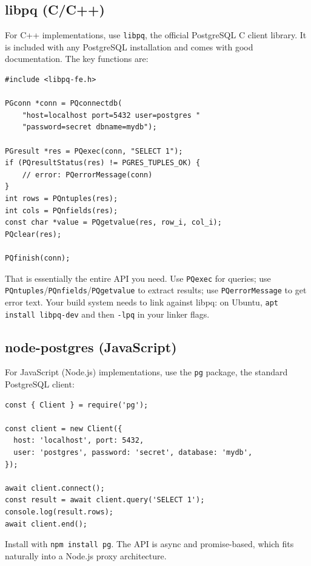 \documentclass[11pt,a4paper]{article}
\begin{document}
\subsection{libpq (C/C++)}
For C++ implementations, use \texttt{libpq}, the official PostgreSQL C client library. It is included with any PostgreSQL installation and comes with good documentation. The key functions are:

\begin{codebox}
\begin{lstlisting}
#include <libpq-fe.h>

PGconn *conn = PQconnectdb(
    "host=localhost port=5432 user=postgres "
    "password=secret dbname=mydb");

PGresult *res = PQexec(conn, "SELECT 1");
if (PQresultStatus(res) != PGRES_TUPLES_OK) {
    // error: PQerrorMessage(conn)
}
int rows = PQntuples(res);
int cols = PQnfields(res);
const char *value = PQgetvalue(res, row_i, col_i);
PQclear(res);

PQfinish(conn);
\end{lstlisting}
\end{codebox}

That is essentially the entire API you need. Use \texttt{PQexec} for queries; use \texttt{PQntuples}/\texttt{PQnfields}/\texttt{PQgetvalue} to extract results; use \texttt{PQerrorMessage} to get error text. Your build system needs to link against libpq: on Ubuntu, \texttt{apt install libpq-dev} and then \texttt{-lpq} in your linker flags.

\subsection{node-postgres (JavaScript)}
For JavaScript (Node.js) implementations, use the \texttt{pg} package, the standard PostgreSQL client:

\begin{codebox}
\begin{lstlisting}
const { Client } = require('pg');

const client = new Client({
  host: 'localhost', port: 5432,
  user: 'postgres', password: 'secret', database: 'mydb',
});

await client.connect();
const result = await client.query('SELECT 1');
console.log(result.rows);
await client.end();
\end{lstlisting}
\end{codebox}

Install with \texttt{npm install pg}. The API is async and promise-based, which fits naturally into a Node.js proxy architecture.
\end{document}
